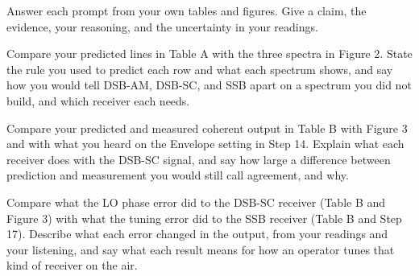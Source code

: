 \documentclass{exam}
\begin{document}
\begin{Form}
\vspace{8pt}


Answer each prompt from your own tables and figures. Give a claim, the evidence,
your reasoning, and the uncertainty in your readings.

\begin{questions}

\question Compare your predicted lines in Table A with the three spectra in Figure 2. State the
rule you used to predict each row and what each spectrum shows, and say how you would tell
DSB-AM, DSB-SC, and SSB apart on a spectrum you did not build, and which receiver each needs.
	\begin{solution}[2.0in]\end{solution}

\question Compare your predicted and measured coherent output in Table B with Figure 3 and with
what you heard on the Envelope setting in Step 14. Explain what each receiver does with the
DSB-SC signal, and say how large a difference between prediction and measurement you would
still call agreement, and why.
	\begin{solution}[2.0in]\end{solution}

\newpage
\question Compare what the LO phase error did to the DSB-SC receiver (Table B and Figure 3) with
what the tuning error did to the SSB receiver (Table B and Step 17). Describe what each error
changed in the output, from your readings and your listening, and say what each result means
for how an operator tunes that kind of receiver on the air.
	\begin{solution}[3.0in]\end{solution}

\end{questions}

\docstatement

\end{Form}
\end{document}
